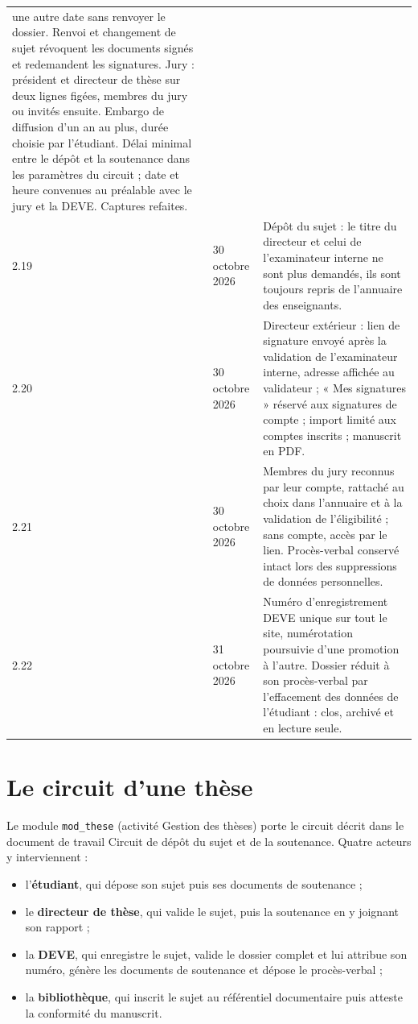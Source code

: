 \documentclass[11pt,a4paper]{article}
\begin{document}
\begin{center}
\begin{tabularx}{\linewidth}{@{}l l X@{}}
une autre date sans renvoyer le dossier. Renvoi et changement de sujet
révoquent les documents signés et redemandent les signatures. Jury : président
et directeur de thèse sur deux lignes figées, membres du jury ou invités
ensuite. Embargo de diffusion d'un an au plus, durée choisie par l'étudiant.
Délai minimal entre le dépôt et la soutenance dans les paramètres du circuit ;
date et heure convenues au préalable avec le jury et la DEVE. Captures
refaites. \\
2.19 & 30 octobre 2026 & Dépôt du sujet : le titre du directeur et celui de
l'examinateur interne ne sont plus demandés, ils sont toujours repris de
l'annuaire des enseignants. \\
2.20 & 30 octobre 2026 & Directeur extérieur : lien de signature envoyé après
la validation de l'examinateur interne, adresse affichée au validateur ; « Mes
signatures » réservé aux signatures de compte ; import limité aux comptes
inscrits ; manuscrit en PDF. \\
2.21 & 30 octobre 2026 & Membres du jury reconnus par leur compte, rattaché au
choix dans l'annuaire et à la validation de l'éligibilité ; sans compte, accès par
le lien. Procès-verbal conservé intact lors des suppressions de données
personnelles. \\
2.22 & 31 octobre 2026 & Numéro d'enregistrement DEVE unique sur tout le site,
numérotation poursuivie d'une promotion à l'autre. Dossier réduit à son
procès-verbal par l'effacement des données de l'étudiant : clos, archivé et en
lecture seule. \\
\bottomrule
\end{tabularx}
\end{center}

\newpage

\section{Le circuit d'une thèse}

Le module \texttt{mod\_these} (activité \og Gestion des thèses\fg{}) porte le
circuit décrit dans le document de travail \og Circuit de dépôt du sujet et de
la soutenance\fg{}. Quatre acteurs y interviennent :

\begin{itemize}
  \item l'\textbf{étudiant}, qui dépose son sujet puis ses documents de soutenance ;
  \item le \textbf{directeur de thèse}, qui valide le sujet, puis la soutenance
        en y joignant son rapport ;
  \item la \textbf{DEVE}, qui enregistre le sujet, valide le dossier complet et
        lui attribue son numéro, génère les documents de soutenance et dépose le
        procès-verbal ;
  \item la \textbf{bibliothèque}, qui inscrit le sujet au référentiel
        documentaire puis atteste la conformité du manuscrit.
\end{itemize}
\end{document}

